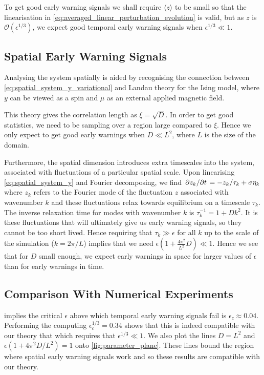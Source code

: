   To get good early warning signals we shall require $\langle z\rangle$ to be small so that the linearisation in
  \cref{eq:averaged_linear_perturbation_evolution} is valid, but as $z$ is $\mathcal{O}\left(\epsilon^{1/3}\right)$\cite{Berglund2006},
  we expect good temporal early warning signals when $\epsilon^{1/3} \ll 1$.

  \subsection{Spatial Early Warning Signals}
  Analysing the system spatially is aided by recognising the connection between \cref{eq:spatial_system_y_variational} and Landau theory for the Ising
  model\cite{goldenfeld1992}, where
  $y$ can be viewed as a spin and $\mu$ as an external applied magnetic field.

  This theory gives the correlation length as $\xi = \sqrt{D}$. In order to get good statistics, we need to be sampling over a region
  large compared to $\xi$. Hence we only expect to get good early warnings when $D \ll L^2$, where $L$ is the size of the domain.

    Furthermore, the spatial dimension introduces extra timescales into the system, associated with
    fluctuations of a particular spatial scale. Upon linearising \cref{eq:spatial_system_y} and Fourier decomposing, we find
    $\pdv*{z_k}{t} = -z_k/\tau_k + \sigma\eta_k$ where $z_k$ refers to the Fourier mode of the fluctuation $z$ associated with wavenumber $k$ and 
    these fluctuations relax towards 
    equilibrium on a timescale $\tau_k$. The inverse relaxation time
    for modes with wavenumber $k$ is $\tau_k^{-1} = 1 + Dk^2$. It is these fluctuations that will ultimately
    give us early warning signals, so they cannot be too short lived. Hence requiring that 
    $\tau_k \gg \epsilon$
    for all $k$ up to the scale of the simulation ($k = 2\pi/L$) implies
    that we need $\epsilon(1+\frac{4\pi^2}{L^2} D)\ll 1$. Hence we see that for $D$ small enough, we 
    expect early warnings in space for larger values of $\epsilon$ than for early warnings in time.

    \subsection{Comparison With Numerical Experiments}
     implies the critical $\epsilon$ above which temporal early warning signals fail is $\epsilon_c \approx 0.04$.
    Performing the computing $\epsilon_c^{1/3} = 0.34$ shows that this is indeed compatible with our theory that which requires that
    $\epsilon^{1/3} \ll 1$. We also plot the lines $D = L^2$ and $\epsilon\left(1 + 4\pi^2 D/L^2\right) = 1$ onto \cref{fig:parameter_plane}.
    These lines bound the region where spatial early warning signals work and so these results are compatible with our theory.
